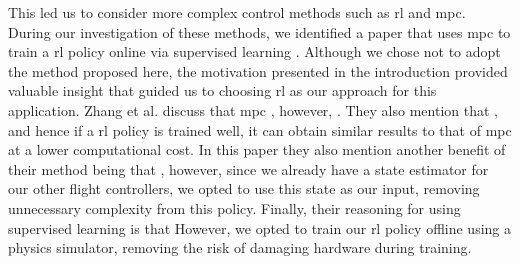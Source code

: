 \documentclass{report_template_oxford}
\begin{document}
This led us to consider more complex control methods such as \gls{rl} and \gls{mpc}. During our investigation of these methods, we identified a paper that uses \gls{mpc} to train a \gls{rl} policy online via supervised learning \cite{zhang_learning_2016}. Although we chose not to adopt the method proposed here, the motivation presented in the introduction provided valuable insight that guided us to choosing \gls{rl} as our approach for this application. Zhang et al. discuss that \gls{mpc} , however, . They also mention that , and hence if a \gls{rl} policy is trained well, it can obtain similar results to that of \gls{mpc} at a lower computational cost. In this paper they also mention another benefit of their method being that , however, since we already have a state estimator for our other flight controllers, we opted to use this state as our input, removing unnecessary complexity from this policy. Finally, their reasoning for using supervised learning is that  However, we opted to train our \gls{rl} policy offline using a physics simulator, removing the risk of damaging hardware during training.
\end{document}
